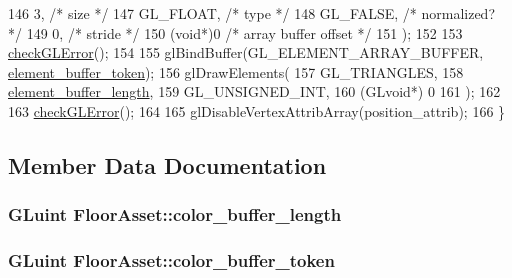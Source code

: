 \begin{DoxyCode}
146                         3,                             \textcolor{comment}{/* size */}
147                         GL\_FLOAT,                      \textcolor{comment}{/* type */}
148                         GL\_FALSE,                      \textcolor{comment}{/* normalized? */}
149                         0,                             \textcolor{comment}{/* stride */}
150                         (\textcolor{keywordtype}{void}*)0                       \textcolor{comment}{/* array buffer offset */}
151                         );
152 
153   \hyperlink{FloorAsset_8cc_a75f201b0e53e68726854997957322b8d}{checkGLError}();
154 
155   glBindBuffer(GL\_ELEMENT\_ARRAY\_BUFFER, \hyperlink{classFloorAsset_ab9be3a61a423156c7e79c73cd1cd5fc4}{element\_buffer\_token});
156   glDrawElements(
157                  GL\_TRIANGLES,
158                  \hyperlink{classFloorAsset_ad42145830ac04a31ca27fd290cf0ef08}{element\_buffer\_length},
159                  GL\_UNSIGNED\_INT,
160                  (GLvoid*) 0
161                  );
162 
163   \hyperlink{FloorAsset_8cc_a75f201b0e53e68726854997957322b8d}{checkGLError}();
164 
165   glDisableVertexAttribArray(position\_attrib);
166 \}
\end{DoxyCode}


\subsection{Member Data Documentation}
\hypertarget{classFloorAsset_a5e4aa3ffef39690775a950c85fb08a2a}{}
\subsubsection[{color\+\_\+buffer\+\_\+length}]{\setlength{\rightskip}{0pt plus 5cm}G\+Luint Floor\+Asset\+::color\+\_\+buffer\+\_\+length\hspace{0.3cm}{\ttfamily [private]}}\label{classFloorAsset_a5e4aa3ffef39690775a950c85fb08a2a}
\hypertarget{classFloorAsset_a54863f3a9f4c2f484342359ac49ca419}{}
\subsubsection[{color\+\_\+buffer\+\_\+token}]{\setlength{\rightskip}{0pt plus 5cm}G\+Luint Floor\+Asset\+::color\+\_\+buffer\+\_\+token\hspace{0.3cm}{\ttfamily [private]}}\label{classFloorAsset_a54863f3a9f4c2f484342359ac49ca419}
\hypertarget{classFloorAsset_ad42145830ac04a31ca27fd290cf0ef08}{}
